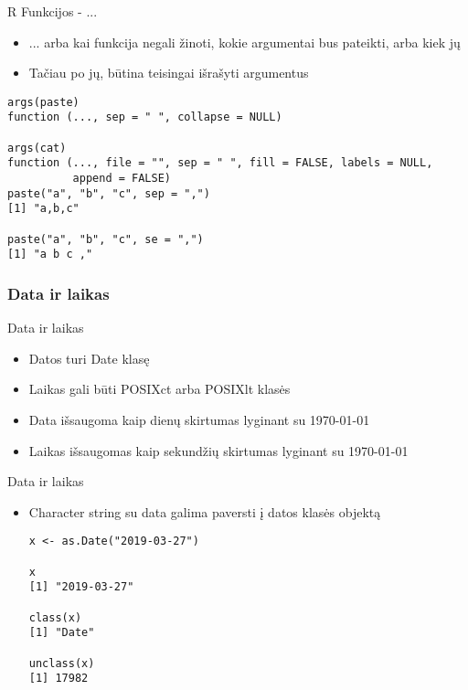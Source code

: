 \documentclass[11pt,xcolor=table]{beamer}
\begin{document}

\begin{frame}[fragile]{R Funkcijos - ...}
\begin{itemize}
\item ...  arba kai funkcija negali žinoti, kokie argumentai bus pateikti, arba kiek jų
\item Tačiau po jų, būtina teisingai išrašyti argumentus

\end{itemize}
\begin{lstlisting}
args(paste)
function (..., sep = " ", collapse = NULL) 

args(cat)
function (..., file = "", sep = " ", fill = FALSE, labels = NULL, 
          append = FALSE) 
paste("a", "b", "c", sep = ",")
[1] "a,b,c"

paste("a", "b", "c", se = ",")
[1] "a b c ,"
\end{lstlisting}
\end{frame}

\subsubsection{Data ir laikas}

\begin{frame}[fragile]{Data ir laikas}
\begin{itemize}
\item Datos turi Date klasę
\item Laikas gali būti POSIXct arba POSIXlt klasės
\item Data išsaugoma kaip dienų skirtumas lyginant su 1970-01-01
\item Laikas išsaugomas kaip sekundžių skirtumas lyginant su 1970-01-01
\end{itemize}
\end{frame}


\begin{frame}[fragile]{Data ir laikas}
\begin{itemize}
\item Character string su data galima paversti į datos klasės objektą
\begin{lstlisting}
x <- as.Date("2019-03-27")

x
[1] "2019-03-27"

class(x)
[1] "Date"

unclass(x)
[1] 17982
\end{lstlisting}
\end{itemize}
\end{frame}
\end{document}
